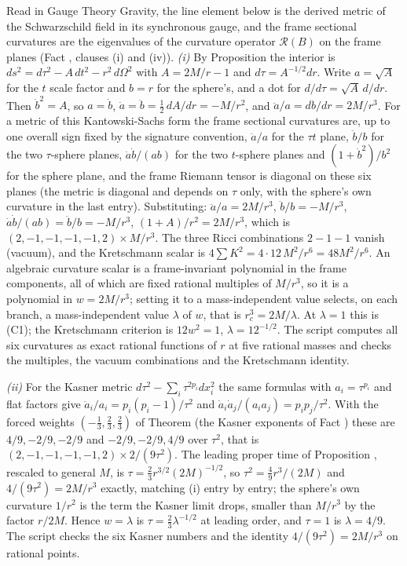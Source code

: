 Read in Gauge Theory Gravity, the line element below is the derived metric of the Schwarzschild field in its synchronous gauge, and the frame sectional curvatures are the eigenvalues of the curvature operator $\mathcal{R}(B)$ on the frame planes (Fact , clauses (i) and (iv)). \emph{(i)} By Proposition  the interior is $ds^{2} = d\tau^{2} - A\,dt^{2} - r^{2}\,d\Omega^{2}$ with $A = 2M/r - 1$ and $d\tau = A^{-1/2}dr$. Write $a = \sqrt A$ for the $t$ scale factor and $b = r$ for the sphere's, and a dot for $d/d\tau = \sqrt A\,d/dr$. Then $\dot b^{2} = A$, so $a = \dot b$, $\dot a = \ddot b = \tfrac12\,dA/dr = -M/r^{2}$, and $\ddot a/a = d\ddot b/dr = 2M/r^{3}$. For a metric of this Kantowski-Sachs form the frame sectional curvatures are, up to one overall sign fixed by the signature convention, $\ddot a/a$ for the $\tau t$ plane, $\ddot b/b$ for the two $\tau$-sphere planes, $\dot a\dot b/(ab)$ for the two $t$-sphere planes and $(1 + \dot b^{2})/b^{2}$ for the sphere plane, and the frame Riemann tensor is diagonal on these six planes (the metric is diagonal and depends on $\tau$ only, with the sphere's own curvature in the last entry). Substituting: $\ddot a/a = 2M/r^{3}$, $\ddot b/b = -M/r^{3}$, $\dot a\dot b/(ab) = \ddot b/b = -M/r^{3}$, $(1 + A)/r^{2} = 2M/r^{3}$, which is $(2, -1, -1, -1, -1, 2) \times M/r^{3}$. The three Ricci combinations $2 - 1 - 1$ vanish (vacuum), and the Kretschmann scalar is $4\sum K^{2} = 4 \cdot 12\,M^{2}/r^{6} = 48M^{2}/r^{6}$. An algebraic curvature scalar is a frame-invariant polynomial in the frame components, all of which are fixed rational multiples of $M/r^{3}$, so it is a polynomial in $w = 2M/r^{3}$; setting it to a mass-independent value selects, on each branch, a mass-independent value $\lambda$ of $w$, that is $r_c^{3} = 2M/\lambda$. At $\lambda = 1$ this is (C1); the Kretschmann criterion is $12w^{2} = 1$, $\lambda = 12^{-1/2}$. The script computes all six curvatures as exact rational functions of $r$ at five rational masses and checks the multiples, the vacuum combinations and the Kretschmann identity.

\emph{(ii)} For the Kasner metric $d\tau^{2} - \sum_i \tau^{2p_i}dx_i^{2}$ the same formulas with $a_i = \tau^{p_i}$ and flat factors give $\ddot a_i/a_i = p_i(p_i - 1)/\tau^{2}$ and $\dot a_i\dot a_j/(a_ia_j) = p_ip_j/\tau^{2}$. With the forced weights $(-\tfrac13, \tfrac23, \tfrac23)$ of Theorem  (the Kasner exponents of Fact ) these are $4/9, -2/9, -2/9$ and $-2/9, -2/9, 4/9$ over $\tau^{2}$, that is $(2, -1, -1, -1, -1, 2) \times 2/(9\tau^{2})$. The leading proper time of Proposition , rescaled to general $M$, is $\tau = \tfrac23 r^{3/2}(2M)^{-1/2}$, so $\tau^{2} = \tfrac49 r^{3}/(2M)$ and $4/(9\tau^{2}) = 2M/r^{3}$ exactly, matching (i) entry by entry; the sphere's own curvature $1/r^{2}$ is the term the Kasner limit drops, smaller than $M/r^{3}$ by the factor $r/2M$. Hence $w = \lambda$ is $\tau = \tfrac23\lambda^{-1/2}$ at leading order, and $\tau = 1$ is $\lambda = 4/9$. The script checks the six Kasner numbers and the identity $4/(9\tau^{2}) = 2M/r^{3}$ on rational points.

